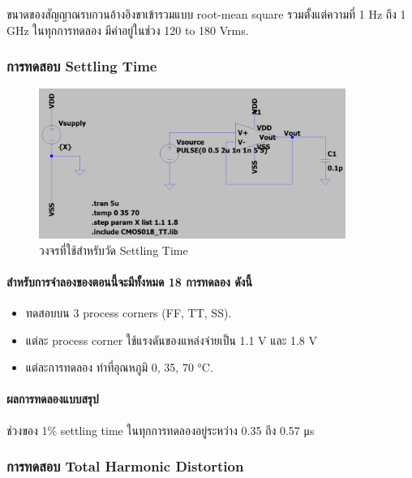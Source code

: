 \documentclass[a4paper, 11pt, oneside]{book} %
\begin{document}
ขนาดของสัญญาณรบกวนอ้างอิงขาเข้ารวมแบบ root-mean square รวมตั้งแต่ความที่ 1 Hz ถึง 1 GHz ในทุกการทดลอง มีค่าอยู่ในช่วง 120 to 180 \textmu Vrms.

\subsubsection{การทดสอบ Settling Time}

\begin{figure}[h]
    \centering
    \includegraphics[width = 10cm]{measure-settlingtime}
    \caption{วงจรที่ใช้สำหรับวัด Settling Time}
    \label{measure-settlingtime}
\end{figure}

\paragraph{สำหรับการจำลองของตอนนี้จะมีทั้งหมด 18 การทดลอง ดังนี้}

\begin{itemize}
    \item ทดสอบบน 3 process corners (FF, TT, SS).
    \item แต่ละ process corner ใช้แรงดันของแหล่งจ่ายเป็น 1.1 V และ 1.8 V
    \item แต่ละการทดลอง ทำที่อุณหภูมิ 0, 35, 70 \si{\degreeCelsius}.
\end{itemize}

\paragraph{ผลการทดลองแบบสรุป}

ช่วงของ 1\% settling time ในทุกการทดลองอยู่ระหว่าง 0.35 ถึง 0.57 \si{\micro s}

\subsubsection{การทดสอบ Total Harmonic Distortion}
\end{document}
